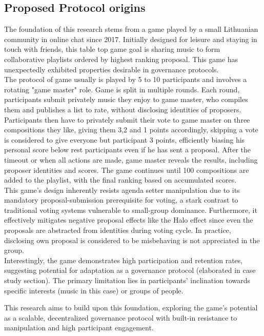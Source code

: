 \documentclass{article}
\begin{document}
\begin{CJK}{UTF8}{gbsn}
\begin{multicols}{2}
        \subsection{Proposed Protocol origins}\label{sec:protocol_origins}
        The foundation of this research stems from a game played by a small Lithuanian community in online chat since 2017. Initially designed for leisure and staying in touch with friends, this table top game goal is sharing music to form collaborative playlists ordered by highest ranking proposal. This game has unexpectedly exhibited properties desirable in governance protocols.\\
        The protocol of game usually is played by 5 to 10 participants and involves a rotating "game master" role. Game is split in multiple rounds. Each round, participants submit privately music they enjoy to game master, who compiles them and publishes a list to rate, without disclosing identities of proposers. Participants then have to privately submit their vote to game master on three compositions they like, giving them 3,2 and 1 points accordingly, skipping a vote is considered to give everyone but participant 3 points, efficiently biasing his personal score below rest participants even if he has sent a proposal. After the timeout or when all actions are made, game master reveals the results, including proposer identities and scores. The game continues until 100 compositions are added to the playlist, with the final ranking based on accumulated scores\cite{DariusYoutube}.\\
        This game's design inherently resists agenda setter manipulation due to its mandatory proposal-submission prerequisite for voting, a stark contrast to traditional voting systems vulnerable to small-group dominance\cite{McKelvey1976}. Furthermore, it effectively mitigates negative proposal effects like the Halo effect \cite{Verhulst2010} since even the proposals are abstracted from identities during voting cycle. In practice, disclosing own proposal is considered to be misbehaving is not appreciated in the group.  \\
        Interestingly, the game demonstrates high participation and retention rates, suggesting potential for adaptation as a governance protocol (elaborated in case study section). The primary limitation lies in participants' inclination towards specific interests (music in this case) or groups of people.

        This research aims to build upon this foundation, exploring the game's potential as a scalable, decentralized governance protocol with built-in resistance to manipulation and high participant engagement.



\end{multicols}
\end{CJK}
\end{document}
